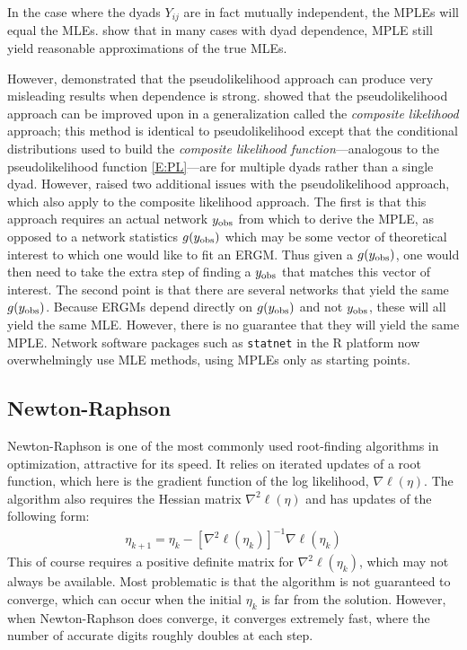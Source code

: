 In the case where the dyads $Y_{ij}$ are in fact mutually independent, the MPLEs will equal the MLEs.  
\citet{Strauss:1990} show that in 
many cases with dyad dependence, MPLE still yield reasonable approximations of the 
true MLEs.  

However, \citet*{Geyer:1992, Snijders:2002, Duijn:2009} demonstrated that 
the pseudolikelihood approach can produce very misleading results 
when dependence is strong.  
\citet*{Composite} showed that the pseudolikelihood approach can be 
improved upon in a generalization 
called the \emph{composite likelihood} approach; this method is identical
to pseudolikelihood except that the conditional distributions used to build the \emph{composite likelihood function}---analogous to the pseudolikelihood function \eqref{E:PL}---are for multiple dyads rather than a single dyad.
However, \citet{Hummel} raised two additional issues with the pseudolikelihood approach, 
which also apply to the composite likelihood approach. 
The first is that this approach requires
an actual network $y_{\text{obs}}$ from which to derive the MPLE, as opposed to a network
statistics $g(y_{\text{obs}})$ which may be some vector of theoretical interest to 
which one would like to fit an ERGM.  Thus given a $g(y_{\text{obs}})$, one would then
need to take the extra step of finding a $y_{\text{obs}}$ that matches this vector of
interest.  The second point is that there are several networks that
yield the same $g(y_{\text{obs}})$.  Because ERGMs depend directly on $g(y_{\text{obs}})$ and not $y_{\text{obs}}$,
these will all yield the same MLE.  However, there is no guarantee that they will yield the same MPLE.
Network software packages such as \texttt{statnet} \citep*{statnet:R} in the R 
platform now overwhelmingly use MLE methods, using MPLEs only as starting points.

\subsection{Newton-Raphson}
Newton-Raphson is one of the most commonly used root-finding algorithms
in optimization, attractive
for its speed.  It relies on iterated updates of a root 
function, which here is the gradient function of the log likelihood, $\nabla \ell(\eta)$.  
The algorithm also requires the Hessian matrix $\nabla^2 \ell(\eta)$ and has updates 
of the following form:
\begin{align}
	\eta_{k+1} = \eta_k - \left[ \nabla^2 \ell(\eta_k) \right ]^{-1} \nabla \ell(\eta_k) 	
\end{align}
This of course requires a positive definite matrix for $\nabla^2 \ell(\eta_k)$, which
may not always be available.  Most problematic is that the algorithm is not guaranteed to 
converge, which can occur when the initial $\eta_k$ is far from the solution.  However,
when Newton-Raphson does converge, it converges extremely fast, 
where the number of accurate digits roughly doubles at each step.

